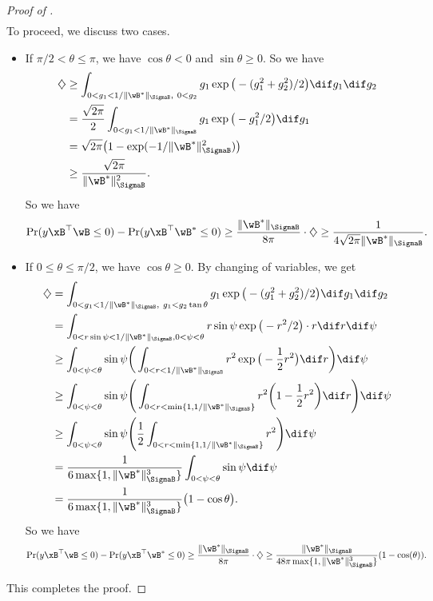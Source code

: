 \documentclass[11pt]{article}
\begin{document}
\begin{proof}[Proof of ]
\begin{align*}
\end{align*}
To proceed, we discuss two cases.
\begin{itemize}[leftmargin=*]
    \item 
{If $\pi/2 < \theta \le \pi$}, we have $\cos\theta<0$ and $\sin \theta\ge 0$. So we have 
\begin{align*}
    \diamondsuit &\ge  \int_{0< g_1< 1/\|\wB^*\|_{\SigmaB}, \  0< g_2 } g_1 \exp\big(-(g_1^2  + g_2^2)/2 \big)\dif g_1\dif g_2 \\
    &= \frac{\sqrt{2\pi}}{2} \int_{0< g_1< 1/\|\wB^*\|_{\SigmaB} } g_1 \exp\big(-g_1^2/2 \big)\dif g_1 \\
    &= \sqrt{2\pi} \big( 1- \exp(-1/\|\wB^*\|^2_{\SigmaB})\big) \\
    &\ge \frac{\sqrt{2\pi}}{\|\wB^*\|^2_{\SigmaB}}.
\end{align*}
So we have 
\begin{align*}
\Pr(y\xB^\top\wB\le 0) - \Pr(y \xB^\top \wB^* \le 0)  
 \ge \frac{\|\wB^*\|_{\SigmaB}}{8\pi }\cdot \diamondsuit  \ge \frac{1}{4\sqrt{2\pi}\|\wB^*\|_{\SigmaB}}.
\end{align*}

\item {If $0\le  \theta \le \pi/2$}, we have $\cos\theta\ge 0$. By changing of variables, we get
\begin{align*}
\diamondsuit &= \int_{0< g_1< 1/\|\wB^*\|_{\SigmaB}, \  g_1 < g_2\tan\theta } g_1 \exp\big(-(g_1^2  + g_2^2)/2 \big)\dif g_1\dif g_2 \\
    &= \int_{0< r\sin \psi < 1/\|\wB^*\|_{\SigmaB}, 0<\psi< \theta} r\sin \psi \exp\big(-r^2/2 \big) \cdot r \dif r \dif \psi \\
& \ge \int_{0< \psi <\theta} \sin\psi \bigg( \int_{0< r< 1/\|\wB^*\|_{\SigmaB}} r^2 \exp\big(-\frac{1}{2}r^2 \big)\dif r  \bigg) \dif \psi \\
&\ge \int_{0< \psi <\theta} \sin\psi \Bigg(\int_{0< r< \min\{ 1, 1/\|\wB^*\|_{\SigmaB}\} } r^2 \bigg(1-\frac{1}{2}r^2 \bigg)\dif r \Bigg) \dif \psi \\
     &\ge \int_{0< \psi <\theta} \sin\psi \Bigg( \frac{1}{2}\int_{0< r< \min\{ 1, 1/\|\wB^*\|_{\SigmaB}\} } r^2 \Bigg) \dif \psi \\
    & = \frac{1}{6\max\{1, \|\wB^*\|_{\SigmaB}^3\} } \int_{0< \psi <\theta} \sin\psi\dif \psi \\
    &= \frac{1}{6\max\{1, \|\wB^*\|_{\SigmaB}^3\} } \big( 1-\cos\theta\big).
\end{align*}
So we have 
\begin{align*}
\Pr(y\xB^\top\wB\le 0) - \Pr(y \xB^\top \wB^* \le 0)  
 \ge \frac{\|\wB^*\|_{\SigmaB}}{8\pi }\cdot \diamondsuit  
\ge  \frac{\|\wB^*\|_{\SigmaB}}{48\pi \max\{1, \|\wB^*\|_{\SigmaB}^3\} }(1-\cos(\theta)).
\end{align*}
\end{itemize}
This completes the proof.
\end{proof}
\end{document}
